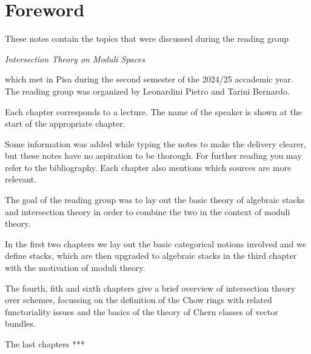 \chapter*{Foreword}

These notes contain the topics that were discussed during the reading group
\begin{center}
    \textit{Intersection Theory on Moduli Spaces}
\end{center}
which met in Pisa during the second semester of the 2024/25 accademic year.
The reading group was organized by Leonardini Pietro and Tarini Bernardo. 

Each chapter corresponds to a lecture. The name of the speaker is shown at the start of the appropriate chapter.


Some information was added while typing the notes to make the delivery clearer, but these notes have no aspiration to be thorough. For further reading you may refer to the bibliography. Each chapter also mentions which sources are more relevant.


\medskip


The goal of the reading group was to lay out the basic theory of algebraic stacks and intersection theory in order to combine the two in the context of moduli theory.

In the first two chapters we lay out the basic categorical notions involved and we define stacks, which are then upgraded to algebraic stacks in the third chapter with the motivation of moduli theory.

The fourth, fith and sixth chapters give a brief overview of intersection theory over schemes, focussing on the definition of the Chow rings with related functoriality issues and the basics of the theory of Chern classes of vector bundles.

The last chapters ***



